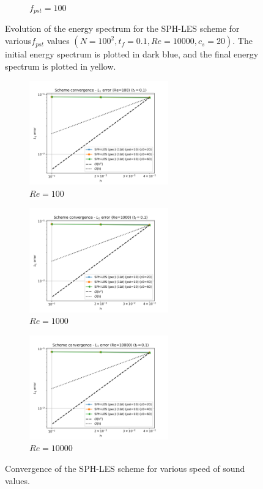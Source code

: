 \begin{figure}[H]
\begin{subfigure}{7cm}
    \caption{$f_{pst} = 100$}
  \end{subfigure}
  \caption{Evolution of the energy spectrum for the SPH-LES scheme for various$f_{pst}$ values $(N=100^2, t_f=0.1, Re=10000, c_s=20)$. The initial energy spectrum is plotted in dark blue, and the final energy spectrum is plotted in yellow.}
  \label{fig:okra2022-pst-espec}
\end{figure}


\begin{figure}[H]
  \begin{subfigure}{7cm}
    \centering\includegraphics[width=6cm]{Code-Figures/okra2022/c0/dt_pois_conv_c0_pec_re_100.png}
    \caption{$Re = 100$}
  \end{subfigure}
  \begin{subfigure}{7cm}
    \centering\includegraphics[width=6cm]{Code-Figures/okra2022/c0/dt_pois_conv_c0_pec_re_1000.png}
    \caption{$Re = 1000$}
  \end{subfigure}
  \begin{subfigure}{7cm}
    \centering\includegraphics[width=6cm]{Code-Figures/okra2022/c0/dt_pois_conv_c0_pec_re_10000.png}
    \caption{$Re = 10000$}
  \end{subfigure}
  \caption{Convergence of the SPH-LES scheme for various speed of sound values.}
  \label{fig:okra2022-c0}
\end{figure}

